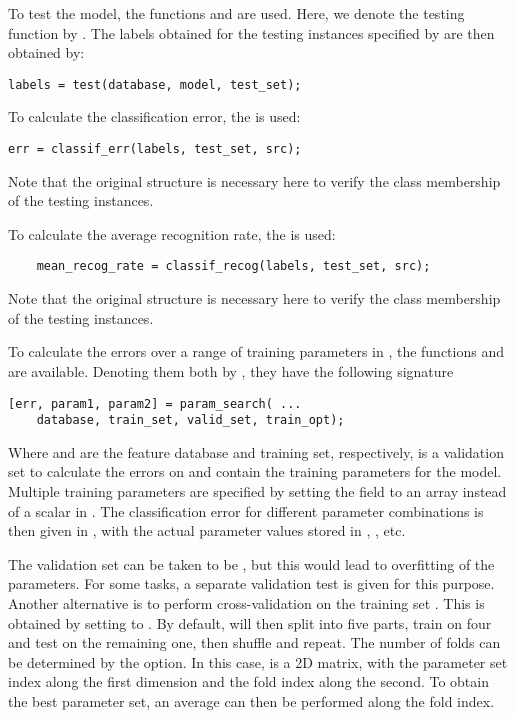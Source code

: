 \documentclass{article}
\begin{document}
To test the model, the functions  and  are used. Here, we denote the testing function by . The labels obtained for the testing instances specified by  are then obtained by:
\begin{lstlisting}
labels = test(database, model, test_set);
\end{lstlisting}
To calculate the classification error, the  is used:
\begin{lstlisting}
err = classif_err(labels, test_set, src);
\end{lstlisting}
Note that the original  structure is necessary here to verify the class membership of the testing instances.

To calculate the average recognition rate, the  is used:
\begin{lstlisting}
    mean_recog_rate = classif_recog(labels, test_set, src);
\end{lstlisting}
Note that the original  structure is necessary here to verify the class membership of the testing instances.

To calculate the errors over a range of training parameters in , the functions  and  are available. Denoting them both by , they have the following signature
\begin{lstlisting}
[err, param1, param2] = param_search( ...
	database, train_set, valid_set, train_opt);
\end{lstlisting}

Where  and  are the feature database and training set, respectively,  is a validation set to calculate the errors on and  contain the training parameters for the model. Multiple training parameters are specified by setting the field to an array instead of a scalar in . The classification error for different parameter combinations is then given in , with the actual parameter values stored in , , etc.

The validation set can be taken to be , but this would lead to overfitting of the parameters. For some tasks, a separate validation test is given for this purpose. Another alternative is to perform cross-validation on the training set . This is obtained by setting  to \mcode{[]}. By default,  will then split  into five parts, train on four and test on the remaining one, then shuffle and repeat. The number of folds can be determined by the  option. In this case,  is a 2D matrix, with the parameter set index along the first dimension and the fold index along the second. To obtain the best parameter set, an average can then be performed along the fold index.
\end{document}

